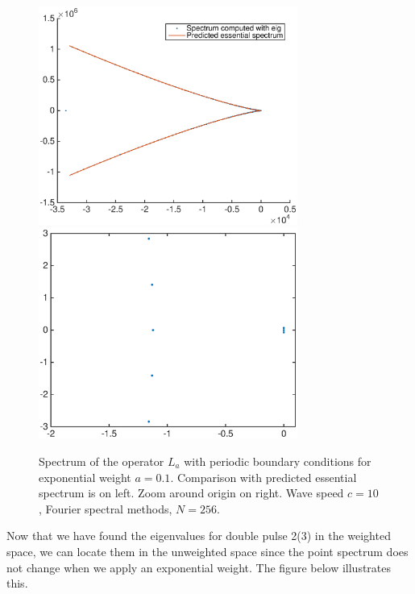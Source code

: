 \documentclass[12pt]{article}
\begin{document}
\begin{figure}[H]
	\includegraphics[width=8.5cm]{four10ud2_3expwt}
	\includegraphics[width=8.5cm]{four10ud2_3expwt2}
	\caption{Spectrum of the operator $L_a$ with periodic boundary conditions for exponential weight $a = 0.1$. Comparison with predicted essential spectrum is on left. Zoom around origin on right. Wave speed $c = 10$, Fourier spectral methods, $N = 256$.}
\end{figure}

Now that we have found the eigenvalues for double pulse 2(3) in the weighted space, we can locate them in the unweighted space since the point spectrum does not change when we apply an exponential weight. The figure below illustrates this.
\end{document}
